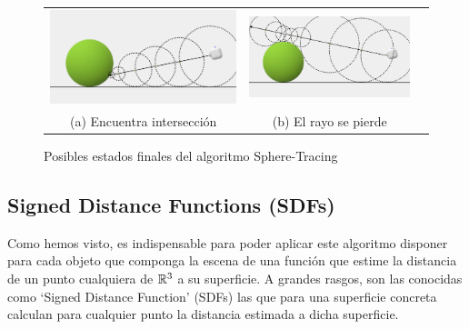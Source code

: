 \begin{figure}[ht]
    \centering
    \begin{tabular}{ccc}
      \includegraphics[scale=0.2]{img/C9/sphere-tracing-final.png} &     \includegraphics[scale=0.197]{img/C9/sphere-tracing-miss.png} \\
    (a) Encuentra intersección & (b) El rayo se pierde \\[6pt]
    \end{tabular}
    \caption{Posibles estados finales del algoritmo Sphere-Tracing}
    \label{fig:finales}
\end{figure}

\subsection{Signed Distance Functions (SDFs)}
\label{subsection:SDFs}

Como hemos visto, es indispensable para poder aplicar este algoritmo disponer para cada objeto que componga la escena de una función que estime la distancia de un punto cualquiera de $\mathbb{R}^3$ a su superficie. A grandes rasgos, son las conocidas como `Signed Distance Function' (SDFs) las que para una superficie concreta calculan para cualquier punto la distancia estimada a dicha superficie.

